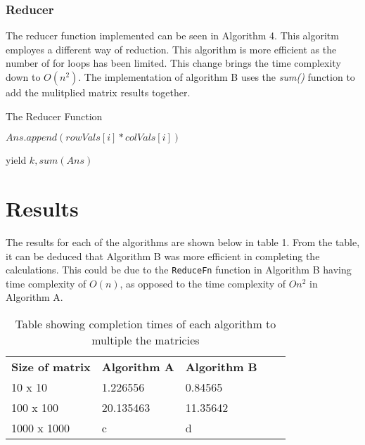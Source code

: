 \documentclass[twocolumn]{IEEEtran}
\begin{document}
		
	\subsubsection{Reducer}
	The reducer function implemented can be seen in Algorithm 4. This algoritm employes a different way of reduction. This algorithm is more efficient as the number of for loops has been limited. This change brings the time complexity down to $O(n^{2})$. The implementation of algorithm B uses the \textit{sum()} function to add the mulitplied matrix results together.
	
	
		
		\begin{algorithm}
			\caption{The Reducer Function}
			\begin{algorithmic} 
				
				
				
				\ENDIF
				\ENDIF
				
				\ENDFOR
				\STATE $Ans.append(rowVals[i]*colVals[i])$
				\ENDFOR
				
				\STATE yield $ k,sum(Ans)$
				
			
			\end{algorithmic}
		\end{algorithm}
	
	\section{Results}
	The results for each of the algorithms are shown below in table 1. From the table, it can be deduced that Algorithm B was more efficient in completing the calculations. This could be due to the \texttt{ReduceFn} function in Algorithm B having time complexity of $O(n)$, as opposed to the time complexity of $O{n^2}$ in Algorithm A.
	
\begin{table}[!h]
	\centering
	\caption{Table showing completion times of each algorithm to multiple the matricies}
	\label{my-label}
	\begin{tabular}{|l|l|l|ll}
		\cline{1-3}
		\textbf{Size of matrix} & \textbf{Algorithm A} & \textbf{Algorithm B} &  &  \\ \cline{1-3}
		10 x 10                 & 1.226556             & 0.84565                    &  &  \\ \cline{1-3}
		100 x 100               & 20.135463            & 11.35642                    &  &  \\ \cline{1-3}
		1000 x 1000             & c                    & d                    &  &  \\ \cline{1-3}
	\end{tabular}
\end{table}
\end{document}

